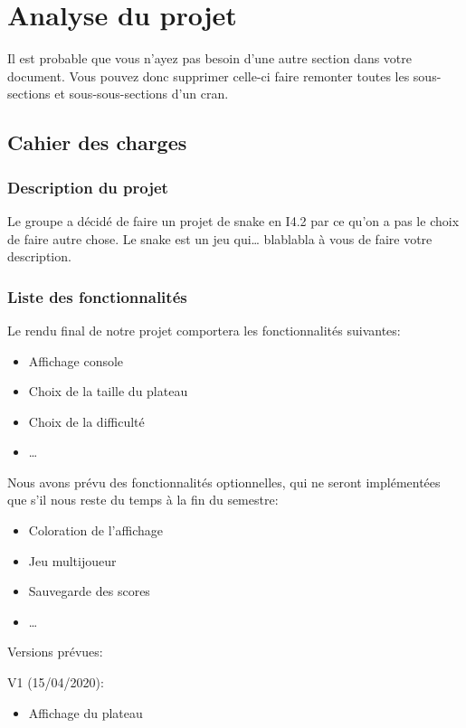 \section{Analyse du projet}
Il est probable que vous n'ayez pas besoin d'une autre section dans votre document.
Vous pouvez donc supprimer celle-ci faire remonter toutes les sous-sections et sous-sous-sections d'un cran.
    
    \subsection{Cahier des charges}
        \subsubsection{Description du projet}
            Le groupe a décidé de faire un projet de snake en I4.2 par ce qu'on a pas le choix de faire autre chose.
            Le snake est un jeu qui… blablabla à vous de faire votre description.
        \subsubsection{Liste des fonctionnalités}\label{sssect:fonctionnalites}
            Le rendu final de notre projet comportera les fonctionnalités suivantes:
            \begin{itemize}
                \item Affichage console
                \item Choix de la taille du plateau
                \item Choix de la difficulté
                \item …
            \end{itemize}
            
            Nous avons prévu des fonctionnalités optionnelles, qui ne seront implémentées que s'il nous reste du temps à la fin du semestre:
            \begin{itemize}
                \item Coloration de l'affichage
                \item Jeu multijoueur
                \item Sauvegarde des scores
                \item …
            \end{itemize}
            
            Versions prévues:
            
            V1 (15/04/2020):
            \begin{itemize}
                \item Affichage du plateau
            \end{itemize}
            
